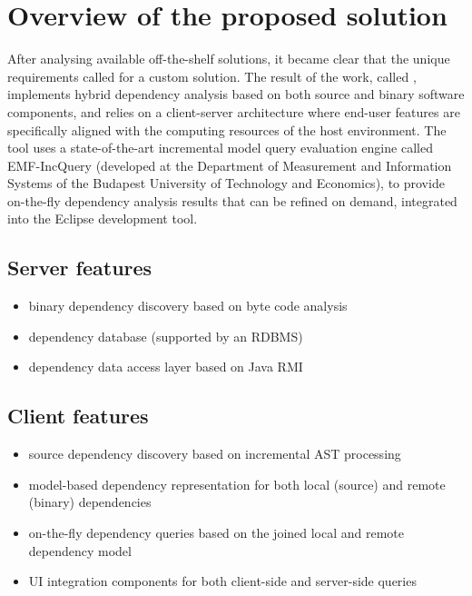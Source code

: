 \section{Overview of the proposed solution}
After analysing available off-the-shelf solutions, it became clear that the
unique requirements called for a custom solution. The result of the work, called
\ptool{}, implements hybrid dependency analysis based on both source and binary
software components, and relies on a client-server architecture where end-user
features are specifically aligned with the computing resources of the host
environment. The tool uses a state-of-the-art incremental model query evaluation
engine called EMF-IncQuery (developed at the Department of Measurement and
Information Systems of the Budapest University of Technology and Economics), to
provide on-the-fly dependency analysis results that can be refined on demand,
integrated into the Eclipse development tool.

\subsection{Server features}

\begin{itemize}
  \item binary dependency discovery based on byte code analysis
  \item dependency database (supported by an RDBMS)
  \item dependency data access layer based on Java RMI
\end{itemize}

\subsection{Client features}

\begin{itemize}
  \item source dependency discovery based on incremental AST processing
  \item model-based dependency representation for both local (source) and remote (binary) dependencies
  \item on-the-fly dependency queries based on the joined local and remote dependency model 
  \item UI integration components for both client-side and server-side queries
\end{itemize}

